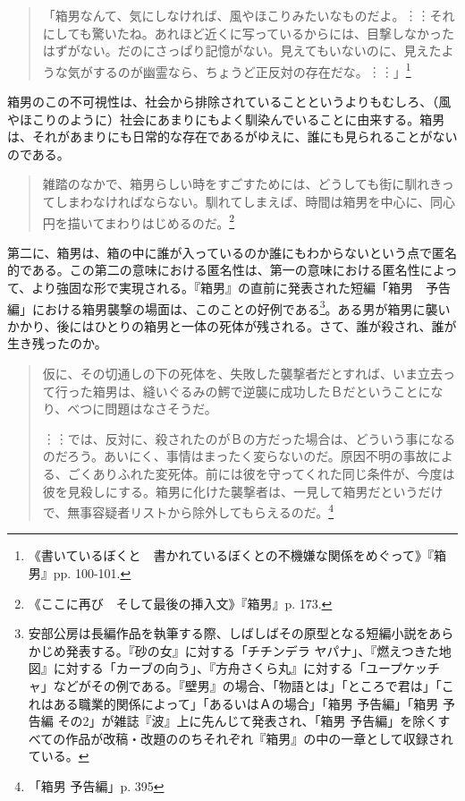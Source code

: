 \documentclass[9pt,b5j,twoside,twocolumn]{utarticle}
\begin{document}
\begin{quotation}
「箱男なんて、気にしなければ、風やほこりみたいなものだよ。︙︙それにしても驚いたね。あれほど近くに写っているからには、目撃しなかったはずがない。だのにさっぱり記憶がない。見えてもいないのに、見えたような気がするのが幽霊なら、ちょうど正反対の存在だな。︙︙」\footnote{《書いているぼくと　書かれているぼくとの不機嫌な関係をめぐって》『箱男』pp. 100-101.}	
\end{quotation}

箱男のこの不可視性は、社会から排除されていることというよりもむしろ、（風やほこりのように）社会にあまりにもよく馴染んでいることに由来する。箱男は、それがあまりにも日常的な存在であるがゆえに、誰にも見られることがないのである。

\begin{quotation}
雑踏のなかで、箱男らしい時をすごすためには、どうしても街に馴れきってしまわなければならない。馴れてしまえば、時間は箱男を中心に、同心円を描いてまわりはじめるのだ。\footnote{《ここに再び　そして最後の挿入文》『箱男』p. 173.}
\end{quotation}

第二に、箱男は、箱の中に誰が入っているのか誰にもわからないという点で匿名的である。この第二の意味における匿名性は、第一の意味における匿名性によって、より強固な形で実現される。『箱男』の直前に発表された短編「箱男　予告編」における箱男襲撃の場面は、このことの好例である\footnote{安部公房は長編作品を執筆する際、しばしばその原型となる短編小説をあらかじめ発表する。『砂の女』に対する「チチンデラ ヤパナ」、『燃えつきた地図』に対する「カーブの向う」、『方舟さくら丸』に対する「ユープケッチャ」などがその例である。『壁男』の場合、「物語とは」「ところで君は」「これはある職業的関係によって」「あるいはＡの場合」「箱男 予告編」「箱男 予告編 その2」が雑誌『波』上に先んじて発表され、「箱男 予告編」を除くすべての作品が改稿・改題ののちそれぞれ『箱男』の中の一章として収録されている。}。ある男が箱男に襲いかかり、後にはひとりの箱男と一体の死体が残される。さて、誰が殺され、誰が生き残ったのか。

\begin{quotation}
仮に、その切通しの下の死体を、失敗した襲撃者だとすれば、いま立去って行った箱男は、縫いぐるみの鰐で逆襲に成功したＢだということになり、べつに問題はなさそうだ。

︙︙では、反対に、殺されたのがＢの方だった場合は、どういう事になるのだろう。あいにく、事情はまったく変らないのだ。原因不明の事故による、ごくありふれた変死体。前には彼を守ってくれた同じ条件が、今度は彼を見殺しにする。箱男に化けた襲撃者は、一見して箱男だというだけで、無事容疑者リストから除外してもらえるのだ。\footnote{「箱男 予告編」p. 395}
\end{quotation}
\end{document}
